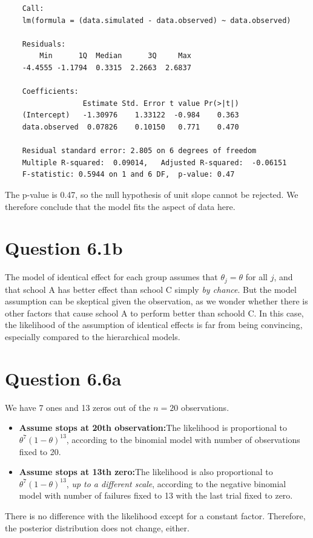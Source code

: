 \documentclass{article}
\begin{document}
{\begin{lstlisting}
    Call:
    lm(formula = (data.simulated - data.observed) ~ data.observed)
    
    Residuals:
        Min      1Q  Median      3Q     Max 
    -4.4555 -1.1794  0.3315  2.2663  2.6837 
    
    Coefficients:
                  Estimate Std. Error t value Pr(>|t|)
    (Intercept)   -1.30976    1.33122  -0.984    0.363
    data.observed  0.07826    0.10150   0.771    0.470
    
    Residual standard error: 2.805 on 6 degrees of freedom
    Multiple R-squared:  0.09014,	Adjusted R-squared:  -0.06151 
    F-statistic: 0.5944 on 1 and 6 DF,  p-value: 0.47
    \end{lstlisting}
    The p-value is 0.47, so the null hypothesis of unit slope cannot be rejected. We therefore conclude that the model fits the aspect of data here. 
}

\section*{Question 6.1b}
{
    The model of identical effect for each group assumes that $\theta_j = \theta$ for all $j$, and that school A has better effect than school C simply \emph{by chance}. But the model assumption can be skeptical given the observation, as we wonder whether there is other factors that cause school A to perform better than schoold C. In this case, the likelihood of the assumption of identical effects is far from being convincing, especially compared to the hierarchical models. 
}

\section*{Question 6.6a}
{
    We have 7 ones and 13 zeros out of the $n=20$ observations. 
    \begin{itemize}
        \item \textbf{Assume stops at 20th observation:}\quad The likelihood is proportional to $\theta^{7} (1-\theta)^{13}$, according to the binomial model with number of observations fixed to 20.
        \item \textbf{Assume stops at 13th zero:}\quad The likelihood is also proportional to $\theta^{7} (1-\theta)^{13}$, \emph{up to a different scale}, according to the negative binomial model with number of failures fixed to 13 with the last trial fixed to zero. 
    \end{itemize}
    There is no difference with the likelihood except for a constant factor. Therefore, the posterior distribution does not change, either.
}
\end{document}
